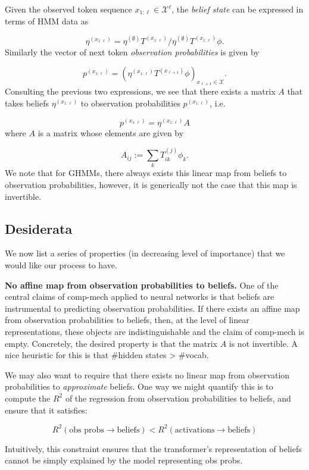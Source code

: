 Given the observed token sequence \(x_{1:\ell}\in \mathcal{X}^\ell\), the \emph{belief state} can be expressed in terms of HMM data as

\[
\eta^{(x_{1:\ell})} = \eta^{(\emptyset)} T^{(x_{1:\ell})} / \eta^{(\emptyset)} T^{(x_{1:\ell})} \phi .
\]
Similarly the vector of next token \emph{observation probabilities} is given by

\[
p^{(x_{1:\ell})} = (\eta^{(x_{1:\ell})}T^{(x_{\ell+1})}\phi)_{x_{\ell+1}\in\mathcal{X}} .
\]
Consulting the previous two expressions, we see that there exists a matrix \(A\) that takes beliefs \(\eta^{(x_{1:\ell})}\) to observation probabilities \(p^{(x_{1:\ell})}\), i.e.

\[
p^{(x_{1:\ell})} = \eta^{(x_{1:\ell})} A
\]
where \(A\) is a matrix whose elements are given by

\[
A_{ij} := \sum_{k} T_{ik}^{(j)} \phi_k .
\]
We note that for GHMMs, there always exists this linear map from beliefs to observation probabilities, however, it is generically not the case that this map is invertible.

\subsection{Desiderata}\label{desiderata}

We now list a series of properties (in decreasing level of importance) that we would like our process to have.

\textbf{No affine map from observation probabilities to beliefs.} One of the central claims of comp-mech applied to neural networks is that beliefs are instrumental to predicting observation probabilities. If there exists an affine map from observation probabilities to beliefs, then, at the level of linear representations, these objects are indistinguishable and the claim of comp-mech is empty. Concretely, the desired property is that the matrix \(A\) is not invertible. A nice heuristic for this is that \#hidden states \textgreater{} \#vocab.

We may also want to require that there exists no linear map from observation probabilities to \emph{approximate} beliefs. One way we might quantify this is to compute the \(R^2\) of the regression from observation probabilities to beliefs, and ensure that it satisfies:

\[ R^2(\text{obs probs} \to \text{beliefs}) < R^2(\text{activations} \to \text{beliefs}) \]

Intuitively, this constraint ensures that the transformer's representation of beliefs cannot be simply explained by the model representing obs probs.

